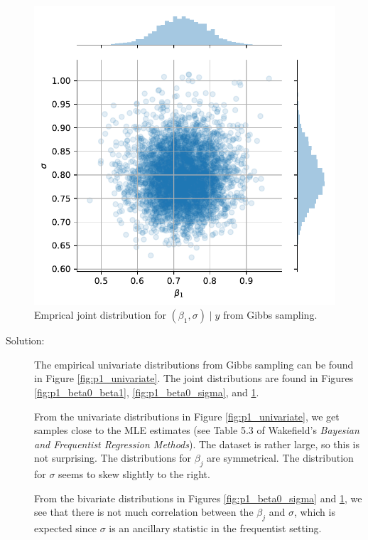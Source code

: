 \documentclass[letterpaper,11pt]{article}
\begin{document}
\begin{enumerate}
\begin{enumerate}
    \begin{figure}      
      \centering
      \caption{Emprical joint distribution for
        $\left(\beta_1, \sigma\right) \mid y$ from Gibbs sampling.}
      \label{fig:p1_beta1_sigma}
      \includegraphics{p1_beta1_sigma.pdf}
    \end{figure}

    
    \begin{description}
    \item[Solution:] The empirical univariate distributions from Gibbs sampling
      can be found in Figure \ref{fig:p1_univariate}. The joint distributions
      are found in Figures \ref{fig:p1_beta0_beta1}, \ref{fig:p1_beta0_sigma},
      and \ref{fig:p1_beta1_sigma}.

      From the univariate distributions in Figure \ref{fig:p1_univariate}, we
      get samples close to the MLE estimates (see Table 5.3 of Wakefield's
      \emph{Bayesian and Frequentist Regression Methods}). The dataset is rather
      large, so this is not surprising. The distributions for $\beta_j$ are
      symmetrical. The distribution for $\sigma$ seems to skew slightly to the
      right.

      From the bivariate distributions in Figures \ref{fig:p1_beta0_sigma} and
      \ref{fig:p1_beta1_sigma}, we see that there is not much correlation
      between the $\beta_j$ and $\sigma$, which is expected since $\sigma$ is an
      ancillary statistic in the frequentist setting.


\end{description}
\end{enumerate}
\end{enumerate}
\end{document}
